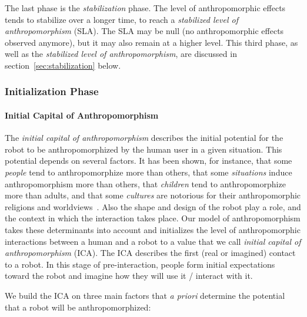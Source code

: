 \documentclass{frontiersSCNS} %
\begin{document}
The last phase is the \emph{stabilization} phase. The level of anthropomorphic
effects tends to stabilize over a longer time, to reach a \emph{stabilized
level of anthropomorphism} (SLA). The SLA may be null (no anthropomorphic
effects observed anymore), but it may also remain at a higher level.  This
third phase, as well as the \emph{stabilized level of anthropomorphism}, are
discussed in section~\ref{sec:stabilization} below.

\subsubsection{Initialization Phase}
\label{sec:initialization}

\paragraph{Initial Capital of Anthropomorphism}
\label{sec:ica}

The \emph{initial capital of anthropomorphism} describes the initial potential
for the robot to be anthropomorphized by the human user in a given situation.
This potential depends on several factors. It has been shown, for instance, that
some \textit{people} tend to anthropomorphize more than others, that some
\textit{situations} induce anthropomorphism more than others, that
\textit{children} tend to anthropomorphize more than adults, and that some
\textit{cultures} are notorious for their anthropomorphic religions and
worldviews~\cite{epley_when_2008}. Also the shape and design of the robot play a
role, and the context in which the interaction takes place. Our model of
anthropomorphism takes these determinants into account and initializes the level
of anthropomorphic interactions between a human and a robot to a value that we
call \emph{initial capital of anthropomorphism} (ICA). The ICA describes the
first (real or imagined) contact to a robot. In this stage of pre-interaction,
people form initial expectations toward the robot and imagine how they will use
it / interact with it.

We build the ICA on three main factors that \emph{a priori} determine the
potential that a robot will be anthropomorphized:
\end{document}
